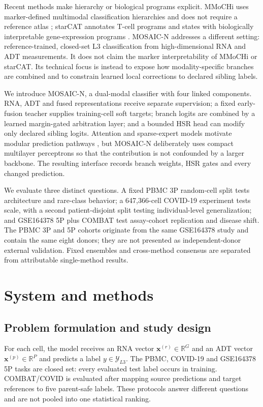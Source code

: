 \documentclass[unnumsec,webpdf,contemporary,large,numbered]{oup-authoring-template}
\begin{document}
Recent methods make hierarchy or biological programs explicit. MMoCHi uses marker-defined multimodal classification hierarchies and does not require a reference atlas \citep{caron2025mmochi}; starCAT annotates T-cell programs and states with biologically interpretable gene-expression programs \citep{kotliar2025starcat}. MOSAIC-N addresses a different setting: reference-trained, closed-set L3 classification from high-dimensional RNA and ADT measurements. It does not claim the marker interpretability of MMoCHi or starCAT. Its technical focus is instead to expose how modality-specific branches are combined and to constrain learned local corrections to declared sibling labels.

We introduce MOSAIC-N, a dual-modal classifier with four linked components. RNA, ADT and fused representations receive separate supervision; a fixed early-fusion teacher supplies training-cell soft targets; branch logits are combined by a learned margin-gated arbitration layer; and a bounded HSR head can modify only declared sibling logits. Attention and sparse-expert models motivate modular prediction pathways \citep{vaswani2017,shazeer2017moe,zhou2022expert}, but MOSAIC-N deliberately uses compact multilayer perceptrons so that the contribution is not confounded by a larger backbone. The resulting interface records branch weights, HSR gates and every changed prediction.

We evaluate three distinct questions. A fixed PBMC 3P random-cell split tests architecture and rare-class behavior; a 647,366-cell COVID-19 experiment tests scale, with a second patient-disjoint split testing individual-level generalization; and GSE164378 5P plus COMBAT test assay-cohort replication and disease shift. The PBMC 3P and 5P cohorts originate from the same GSE164378 study and contain the same eight donors; they are not presented as independent-donor external validation. Fixed ensembles and cross-method consensus are separated from attributable single-method results.

\section{System and methods}

\subsection{Problem formulation and study design}

For each cell, the model receives an RNA vector $\mathbf{x}^{(r)}\in\mathbb{R}^{G}$ and an ADT vector $\mathbf{x}^{(p)}\in\mathbb{R}^{P}$ and predicts a label $y\in\mathcal{Y}_{L3}$. The PBMC, COVID-19 and GSE164378 5P tasks are closed set: every evaluated test label occurs in training. COMBAT/COVID is evaluated after mapping source predictions and target references to five parent-safe labels. These protocols answer different questions and are not pooled into one statistical ranking.
\end{document}
